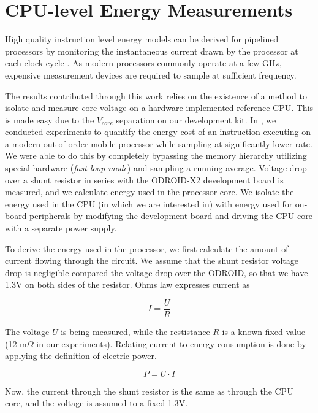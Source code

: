 \section{CPU-level Energy Measurements}

High quality instruction level energy models can be derived for pipelined
processors by monitoring the instantaneous current drawn by the processor at
each clock cycle \cite{nikolaidis2005instruction}. As modern processors commonly
operate at a few GHz, expensive measurement devices are required to sample
at sufficient frequency.

The results contributed through this work relies on the existence of a method to
isolate and measure core voltage on a hardware implemented reference CPU. This
is made easy due to the $V_{core}$ separation on our development kit. In
\cite{rundehvatum2013exploring}, we conducted experiments to quantify the energy
cost of an instruction executing on a modern out-of-order mobile processor while
sampling at significantly lower rate. We were able to do this by completely
bypassing the memory hierarchy utilizing special hardware (\emph{fast-loop
mode}) and sampling a running average. Voltage drop over a shunt resistor in
series with the ODROID-X2 development board is measured, and we calculate energy
used in the processor core. We isolate the energy used in the CPU (in which we
are interested in) with energy used for on-board peripherals by modifying the
development board and driving the CPU core with a separate power supply.

To derive the energy used in the processor, we first calculate the amount of
current flowing through the circuit. We assume that the shunt resistor voltage
drop is negligible compared the voltage drop over the ODROID, so that we have
1.3V on both sides of the resistor. Ohms law expresses current as

\begin{equation}
    I=\frac{U}{R}
    \label{eq:ohm}
\end{equation}

The voltage $U$ is being measured, while the restistance $R$ is a known fixed
value (12 m$\Omega$ in our experiments). Relating current to energy consumption
is done by applying the definition of electric power.

\begin{equation}
    P=U \cdot I
    \label{eq:power}
\end{equation}

Now, the current through the shunt resistor is the same as through the CPU core,
and the voltage is assumed to a fixed 1.3V.


